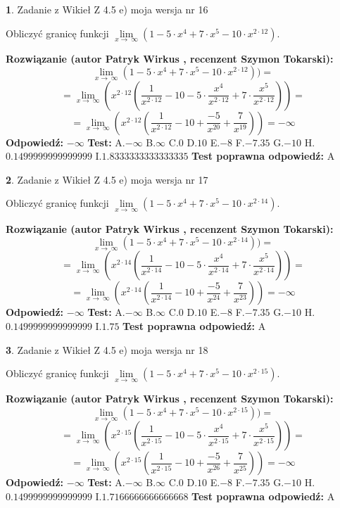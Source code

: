 \documentclass[12pt, a4paper]{article}
\theoremstyle{definition} %
\newtheorem{zad}{}
\newcommand{\zadStart}[1]{\begin{zad}#1\newline}
\newcommand{\zadStop}{\end{zad}}
\newcommand{\rozwStart}[2]{\noindent \textbf{Rozwiązanie (autor #1 , recenzent #2): }\newline}
\newcommand{\rozwStop}{\newline}
\newcommand{\odpStart}{\noindent \textbf{Odpowiedź:}\newline}
\newcommand{\odpStop}{\newline}
\newcommand{\testStart}{\noindent \textbf{Test:}\newline}
\newcommand{\testStop}{\newline}
\newcommand{\kluczStart}{\noindent \textbf{Test poprawna odpowiedź:}\newline}
\newcommand{\kluczStop}{\newline}
\begin{document}
\zadStart{Zadanie z Wikieł Z 4.5 e) moja wersja nr 16}


Obliczyć granicę funkcji  $\lim\limits_{x\to\ \infty}(1 - 5 \cdot x^{4}+7 \cdot x^{5}- 10 \cdot x^{2\cdot12})$.
\zadStop
\rozwStart{Patryk Wirkus}{Szymon Tokarski}
$$\lim\limits_{x\to\ \infty}(1 - 5 \cdot x^{4}+7 \cdot x^{5}- 10 \cdot x^{2\cdot12}))=$$
$$=\lim\limits_{x\to\ \infty}(x^{2\cdot12}(\frac{1}{x^{2\cdot12}}-10 -5 \cdot \frac{x^{4}}{x^{2\cdot12}}+7 \cdot \frac{x^{5}}{x^{2\cdot12}}))=$$
$$=\lim\limits_{x\to\ \infty}(x^{2\cdot12}(\frac{1}{x^{2\cdot12}}-10 + \frac{-5}{x^{20}}+ \frac{7}{x^{19}}))=-\infty$$
\rozwStop
\odpStart
$-\infty$
\odpStop
\testStart
A.$-\infty$ B.$\infty$ C.$0$ D.$10$ E.$-8$
F.$-7.35$ G.$-10$
H.$0.1499999999999999$
I.$1.8333333333333335$
\testStop
\kluczStart
A
\kluczStop



\zadStart{Zadanie z Wikieł Z 4.5 e) moja wersja nr 17}


Obliczyć granicę funkcji  $\lim\limits_{x\to\ \infty}(1 - 5 \cdot x^{4}+7 \cdot x^{5}- 10 \cdot x^{2\cdot14})$.
\zadStop
\rozwStart{Patryk Wirkus}{Szymon Tokarski}
$$\lim\limits_{x\to\ \infty}(1 - 5 \cdot x^{4}+7 \cdot x^{5}- 10 \cdot x^{2\cdot14}))=$$
$$=\lim\limits_{x\to\ \infty}(x^{2\cdot14}(\frac{1}{x^{2\cdot14}}-10 -5 \cdot \frac{x^{4}}{x^{2\cdot14}}+7 \cdot \frac{x^{5}}{x^{2\cdot14}}))=$$
$$=\lim\limits_{x\to\ \infty}(x^{2\cdot14}(\frac{1}{x^{2\cdot14}}-10 + \frac{-5}{x^{24}}+ \frac{7}{x^{23}}))=-\infty$$
\rozwStop
\odpStart
$-\infty$
\odpStop
\testStart
A.$-\infty$ B.$\infty$ C.$0$ D.$10$ E.$-8$
F.$-7.35$ G.$-10$
H.$0.1499999999999999$
I.$1.75$
\testStop
\kluczStart
A
\kluczStop



\zadStart{Zadanie z Wikieł Z 4.5 e) moja wersja nr 18}


Obliczyć granicę funkcji  $\lim\limits_{x\to\ \infty}(1 - 5 \cdot x^{4}+7 \cdot x^{5}- 10 \cdot x^{2\cdot15})$.
\zadStop
\rozwStart{Patryk Wirkus}{Szymon Tokarski}
$$\lim\limits_{x\to\ \infty}(1 - 5 \cdot x^{4}+7 \cdot x^{5}- 10 \cdot x^{2\cdot15}))=$$
$$=\lim\limits_{x\to\ \infty}(x^{2\cdot15}(\frac{1}{x^{2\cdot15}}-10 -5 \cdot \frac{x^{4}}{x^{2\cdot15}}+7 \cdot \frac{x^{5}}{x^{2\cdot15}}))=$$
$$=\lim\limits_{x\to\ \infty}(x^{2\cdot15}(\frac{1}{x^{2\cdot15}}-10 + \frac{-5}{x^{26}}+ \frac{7}{x^{25}}))=-\infty$$
\rozwStop
\odpStart
$-\infty$
\odpStop
\testStart
A.$-\infty$ B.$\infty$ C.$0$ D.$10$ E.$-8$
F.$-7.35$ G.$-10$
H.$0.1499999999999999$
I.$1.7166666666666668$
\testStop
\kluczStart
A
\kluczStop
\end{document}
